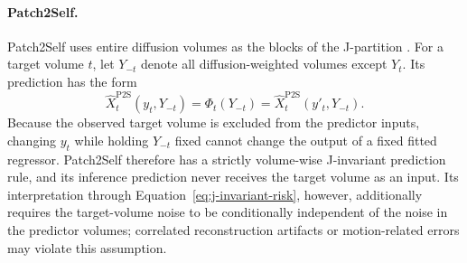 \documentclass[preprint,12pt]{elsarticle}
\begin{document}
\paragraph{Patch2Self.}
Patch2Self uses entire diffusion volumes as the blocks of the J-partition \cite{fadnavis2020patch2self}. For a target volume $t$, let $Y_{-t}$ denote all diffusion-weighted volumes except $Y_t$. Its prediction has the form
\begin{equation}
  \widehat{X}^{\mathrm{P2S}}_t(y_t,Y_{-t})
  =
  \Phi_t(Y_{-t})
  =
  \widehat{X}^{\mathrm{P2S}}_t(y'_t,Y_{-t}).
  \label{eq:patch2self-j-invariance}
\end{equation}
Because the observed target volume is excluded from the predictor inputs, changing $y_t$ while holding $Y_{-t}$ fixed cannot change the output of a fixed fitted regressor. Patch2Self therefore has a strictly volume-wise J-invariant prediction rule, and its inference prediction never receives the target volume as an input. Its interpretation through Equation~\eqref{eq:j-invariant-risk}, however, additionally requires the target-volume noise to be conditionally independent of the noise in the predictor volumes; correlated reconstruction artifacts or motion-related errors may violate this assumption.
\end{document}
